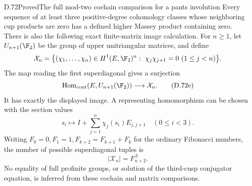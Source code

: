 \begin{claim}{D.72}{Proved}{The full mod-two cochain comparison for a pants involution}
Every sequence of at least three positive-degree cohomology classes whose
neighboring cup products are zero has a defined higher
Massey product containing zero. There is also the following
exact finite-matrix image calculation. For $n\geq1$, let
$U_{n+1}(\F_2)$ be the group of upper unitriangular matrices,
and define
\[
 \begin{gathered}
 \mathcal X_n=\bigl\{(\chi_1,\ldots,\chi_n)\in H^1(E,\F_2)^n:\
                    \chi_j\chi_{j+1}=0\ (1\leq j<n)\bigr\}.
 \end{gathered}
\]
The map reading the first superdiagonal gives a surjection
\[
 \operatorname{Hom}_{\rm cont}(E,U_{n+1}(\F_2))
                  \longrightarrow\mathcal X_n.
                                                               \tag{D.72e}
\]
It has exactly the displayed image. A representing
homomorphism can be chosen with the section values
\[
 s_i\longmapsto
       I+\sum_{j=1}^n\chi_j(s_i)E_{j,j+1}
                                  \quad(0\leq i<3).
                                                               \tag{D.72f}
\]
Writing $F_0=0,F_1=1,F_{k+2}=F_{k+1}+F_k$ for the
ordinary Fibonacci numbers, the number of possible
superdiagonal tuples is
\[
                              |\mathcal X_n|=F_{n+2}^{\,3}.
                                                               \tag{D.72g}
\]
No equality of full profinite groups, or solution of the
third-cusp conjugator equation, is inferred from these
cochain and matrix comparisons.
\end{claim}
